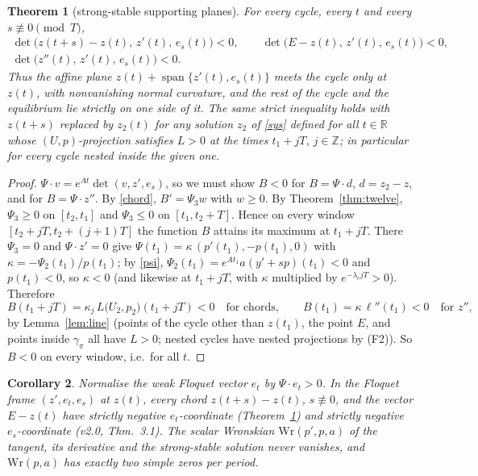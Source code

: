 \documentclass[11pt,a4paper]{article}
\newtheorem{theorem}{Theorem}
\newtheorem{corollary}[theorem]{Corollary}
\theoremstyle{remark}\newtheorem{remark}[theorem]{Remark}
\newcommand{\R}{\mathbb R}
\begin{document}
\begin{theorem}[strong-stable supporting planes]\label{thm:DS}
For every cycle, every $t$ and every $s\not\equiv 0\pmod T$,
\begin{equation}\label{DS}
\begin{gathered}
\det\bigl(z(t+s)-z(t),\,z'(t),\,e_s(t)\bigr)<0,\qquad
\det\bigl(E-z(t),\,z'(t),\,e_s(t)\bigr)<0,\\
\det\bigl(z''(t),\,z'(t),\,e_s(t)\bigr)<0 .
\end{gathered}
\end{equation}
Thus the affine plane $z(t)+\operatorname{span}\{z'(t),e_s(t)\}$ meets the cycle only at $z(t)$,
with nonvanishing normal curvature, and the rest of the cycle and the equilibrium lie strictly on
one side of it. The same strict inequality holds with $z(t+s)$ replaced by $z_2(t)$ for any
solution $z_2$ of \eqref{sys} defined for all $t\in\R$ whose $(U,p)$-projection satisfies
$L>0$ at the times $t_1+jT$, $j\in\mathbb Z$; in particular for every cycle nested inside the
given one.
\end{theorem}
\begin{proof}
$\Psi\cdot v=e^{At}\det(v,z',e_s)$, so we must show $B<0$ for $B=\Psi\cdot d$, $d=z_2-z$,
and for $B=\Psi\cdot z''$. By \eqref{chord}, $B'=\Psi_3w$ with $w\ge0$. By
Theorem~\ref{thm:twelve}, $\Psi_3\ge0$ on $[t_2,t_1]$ and $\Psi_3\le0$ on $[t_1,t_2+T]$. Hence on
every window $[t_2+jT,t_2+(j+1)T]$ the function $B$ attains its maximum at $t_1+jT$.
There $\Psi_3=0$ and $\Psi\cdot z'=0$ give $\Psi(t_1)=\kappa\,(p'(t_1),-p(t_1),0)$ with
$\kappa=-\Psi_2(t_1)/p(t_1)$; by \eqref{psi}, $\Psi_2(t_1)=e^{At_1}a(y'+sp)(t_1)<0$ and
$p(t_1)<0$, so $\kappa<0$ (and likewise at $t_1+jT$, with $\kappa$ multiplied by
$e^{-\lambda_cjT}>0$). Therefore
\[
B(t_1+jT)=\kappa_j\,L\bigl(U_2,p_2\bigr)(t_1+jT)<0\quad\text{for chords},\qquad
B(t_1)=\kappa\,\ell''(t_1)<0\quad\text{for }z'' ,
\]
by Lemma~\ref{lem:line} (points of the cycle other than $z(t_1)$, the point $E$, and points
inside $\gamma_\pi$ all have $L>0$; nested cycles have nested projections by (F2)).
So $B<0$ on every window, i.e.\ for all $t$.
\end{proof}

\begin{corollary}\label{cor:frame}
Normalise the weak Floquet vector $e_t$ by $\Psi\cdot e_t>0$. In the Floquet frame
$(z',e_t,e_s)$ at $z(t)$, every chord $z(t+s)-z(t)$, $s\not\equiv0$, and the vector $E-z(t)$
have strictly negative $e_t$-coordinate (Theorem~\ref{thm:DS}) and strictly negative
$e_s$-coordinate (v2.0, Thm.~3.1). The scalar Wronskian $\mathrm{Wr}(p',p,a)$ of the
tangent, its derivative and the strong-stable solution never vanishes, and
$\mathrm{Wr}(p,a)$ has exactly two simple zeros per period.
\end{corollary}
\end{document}
